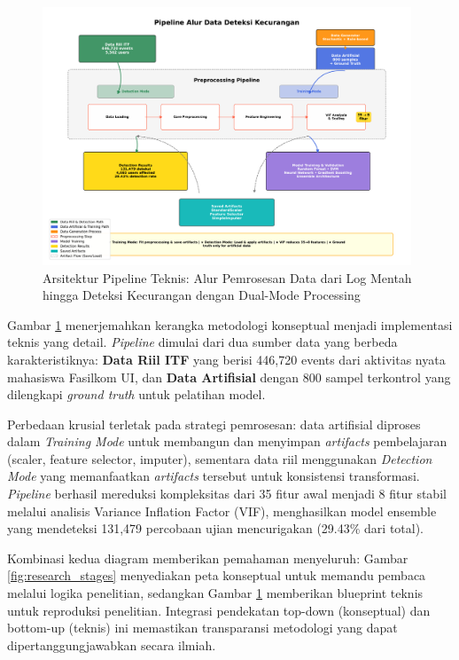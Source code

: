 \begin{figure}[htbp]
    \centering
    \includegraphics[width=0.98\textwidth]{newfigures/technical_pipeline_flow_final.pdf}
    \caption{Arsitektur Pipeline Teknis: Alur Pemrosesan Data dari Log Mentah hingga Deteksi Kecurangan dengan Dual-Mode Processing}
    \label{fig:technical_pipeline}
\end{figure}

Gambar \ref{fig:technical_pipeline} menerjemahkan kerangka metodologi konseptual menjadi implementasi teknis yang detail. \textit{Pipeline} dimulai dari dua sumber data yang berbeda karakteristiknya: \textbf{Data Riil ITF} yang berisi 446,720 events dari aktivitas nyata mahasiswa Fasilkom UI, dan \textbf{Data Artifisial} dengan 800 sampel terkontrol yang dilengkapi \textit{ground truth} untuk pelatihan model. 

Perbedaan krusial terletak pada strategi pemrosesan: data artifisial diproses dalam \textit{Training Mode} untuk membangun dan menyimpan \textit{artifacts} pembelajaran (scaler, feature selector, imputer), sementara data riil menggunakan \textit{Detection Mode} yang memanfaatkan \textit{artifacts} tersebut untuk konsistensi transformasi. \textit{Pipeline} berhasil mereduksi kompleksitas dari 35 fitur awal menjadi 8 fitur stabil melalui analisis Variance Inflation Factor (VIF), menghasilkan model ensemble yang mendeteksi 131,479 percobaan ujian mencurigakan (29.43\% dari total).

Kombinasi kedua diagram memberikan pemahaman menyeluruh: Gambar \ref{fig:research_stages} menyediakan peta konseptual untuk memandu pembaca melalui logika penelitian, sedangkan Gambar \ref{fig:technical_pipeline} memberikan blueprint teknis untuk reproduksi penelitian. Integrasi pendekatan top-down (konseptual) dan bottom-up (teknis) ini memastikan transparansi metodologi yang dapat dipertanggungjawabkan secara ilmiah.

